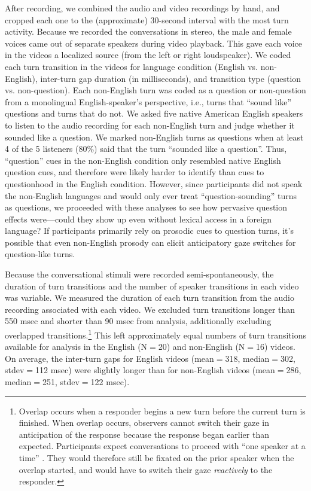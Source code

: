 \documentclass[authoryear, 12pt]{elsarticle}
\begin{document}
After recording, we combined the audio and video recordings by hand, and cropped each one to the (approximate) 30-second interval with the most turn activity. Because we recorded the conversations in stereo, the male and female voices came out of separate speakers during video playback. This gave each voice in the videos a localized source (from the left or right loudspeaker). We coded each turn transition in the videos for language condition (English vs. non-English), inter-turn gap duration (in milliseconds), and transition type (question vs. non-question). Each non-English turn was coded as a question or non-question from a monolingual English-speaker's perspective, i.e., turns that ``sound like'' questions and turns that do not. We asked five native American English speakers to listen to the audio recording for each non-English turn and judge whether it sounded like a question. We marked non-English turns as questions when at least 4 of the 5 listeners (80\%) said that the turn ``sounded like a question''. Thus, ``question'' cues in the non-English condition only resembled native English question cues, and therefore were likely harder to identify than cues to questionhood in the English condition. However, since participants did not speak the non-English languages and would only ever treat ``question-sounding'' turns as questions, we proceeded with these analyses to see how pervasive question effects were---could they show up even without lexical access in a foreign language? If participants primarily rely on prosodic cues to question turns, it's possible that even non-English prosody can elicit anticipatory gaze switches for question-like turns.

Because the conversational stimuli were recorded semi-spontaneously, the duration of turn transitions and the number of speaker transitions in each video was variable. We measured the duration of each turn transition from the audio recording associated with each video. We excluded turn transitions longer than 550 msec and shorter than 90 msec from analysis, additionally excluding overlapped transitions.\footnote{Overlap occurs when a responder begins a new turn before the current turn is finished. When overlap occurs, observers cannot switch their gaze in anticipation of the response because the response began earlier than expected. Participants expect conversations to proceed with ``one speaker at a time'' \citep{sacks1974}. They would therefore still be fixated on the prior speaker when the overlap started, and would have to switch their gaze \textit{reactively} to the responder.} This left approximately equal numbers of turn transitions available for analysis in the English (N$=$20) and non-English (N$=$16) videos. On average, the inter-turn gaps for English videos (mean$=$318, median$=$302, stdev$=$112 msec) were slightly longer than for non-English videos (mean$=$286, median$=$251, stdev$=$122 msec).
\end{document}
